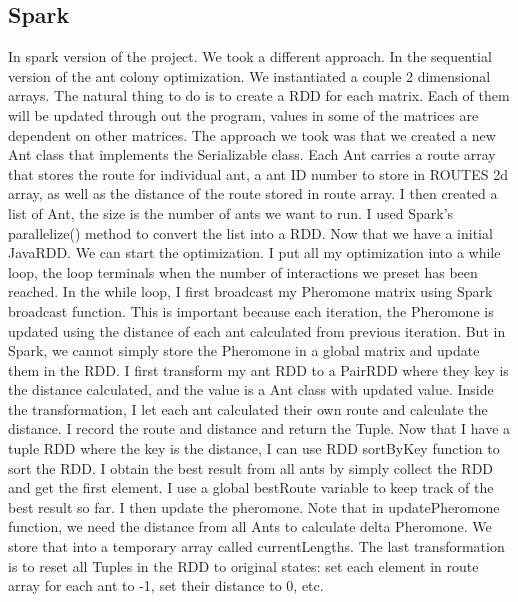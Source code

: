 \documentclass[11pt, letterpaper]{article}
\begin{document}
	\subsection{Spark}
	In spark version of the project. We took a different approach. In the sequential version of the ant colony optimization. We instantiated a couple 2 dimensional arrays. The natural thing to do is to create a RDD for each matrix. Each of them will be updated through out the program, values in some of the matrices are dependent on other matrices. The approach we took was that we created a new Ant class that implements the Serializable class. Each Ant carries a route array that stores the route for individual ant, a ant ID number to store in ROUTES 2d array, as well as the distance of the route stored in route array. I then created a list of Ant, the size is the number of ants we want to run. I used Spark's parallelize() method to convert the list into a RDD. Now that we have a initial JavaRDD. We can start the optimization. I put all my optimization into a while loop, the loop terminals when the number of interactions we preset has been reached. In the while loop, I first broadcast my Pheromone matrix using Spark broadcast function. This is important because each iteration, the Pheromone is updated using the distance of each ant calculated from previous iteration. But in Spark, we cannot simply store the Pheromone in a global matrix and update them in the RDD. I first transform my ant RDD to a PairRDD where they key is the distance calculated, and the value is a Ant class with updated value. Inside the transformation, I let each ant calculated their own route and calculate the distance. I record the route and distance and return the Tuple. Now that I have a tuple RDD where the key is the distance, I can use RDD sortByKey function to sort the RDD. I obtain the best result from all ants by simply collect the RDD and get the first element. I use a global bestRoute variable to keep track of the best result so far. I then update the pheromone. Note that in updatePheromone function, we need the distance from all Ants to calculate delta Pheromone. We store that into a temporary array called currentLengths. The last transformation is to reset all Tuples in the RDD to original states: set each element in route array for each ant to -1, set their distance to 0, etc. 
	
\end{document}
